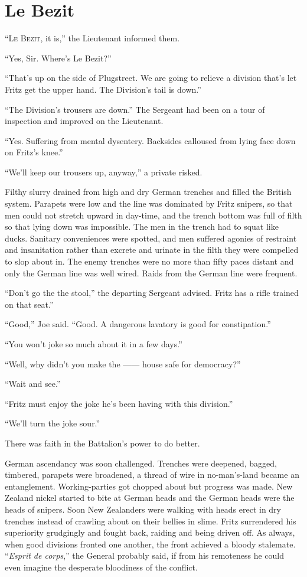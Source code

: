 \chapter*{\textsf{Le Bezit}}

``L\textsc{e} B\textsc{ezit}, it is,'' the Lieutenant informed them.

``Yes, Sir. Where's Le Bezit?''

``That's up on the side of Plugstreet. We are going to relieve a division that's let Fritz get the upper hand. The Division's tail is down.''

``The Division's trousers are down.'' The Sergeant had been on a tour of inspection and improved on the Lieutenant.

``Yes. Suffering from mental dysentery. Backsides calloused from lying face down on Fritz's knee.''

``We'll keep our trousers up, anyway,'' a private risked.

Filthy slurry drained from high and dry German trenches and filled the British system. Parapets were low and the line was dominated by Fritz snipers, so that men could not stretch upward in day-time, and the trench bottom was full of filth so that lying down was impossible. The men in the trench had to squat like ducks. Sanitary conveniences were spotted, and men suffered agonies of restraint and insanitation rather than excrete and urinate in the filth they were compelled to slop about in. The enemy trenches were no more than fifty paces distant and only the German line was well wired. Raids from the German line were frequent.

``Don't go the the stool,'' the departing Sergeant advised. Fritz has a rifle trained on that seat.''

``Good,'' Joe said. ``Good. A dangerous lavatory is good for constipation.''

``You won't joke so much about it in a few days.''

``Well, why didn't you make the ------ house safe for democracy?''

``Wait and see.''

``Fritz must enjoy the joke he's been having with this division.''

``We'll turn the joke sour.''

There was faith in the Battalion's power to do better.

German ascendancy was soon challenged. Trenches were deepened, bagged, timbered, parapets were broadened, a thread of wire in no-man's-land became an entanglement. Working-parties got chopped about but progress was made. New Zealand nickel started to bite at German heads and the German heads were the heads of snipers. Soon New Zealanders were walking with heads erect in dry trenches instead of crawling about on their bellies in slime. Fritz surrendered his superiority grudgingly and fought back, raiding and being driven off. As always, when good divisions fronted one another, the front achieved a bloody stalemate. ``\textit{Esprit de corps},'' the General probably said, if from his remoteness he could even imagine the desperate bloodiness of the conflict.

